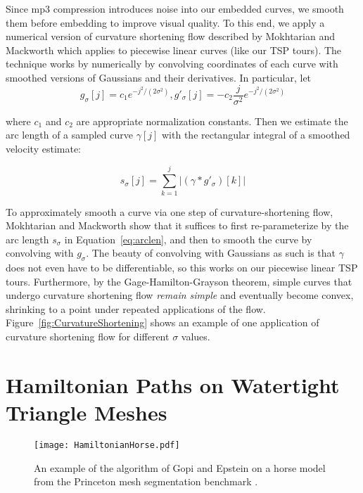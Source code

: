 \documentclass[runningheads]{llncs}
\begin{document}
Since mp3 compression introduces noise into our embedded curves, we smooth them before embedding to improve visual quality.  To this end, we apply a numerical version of curvature shortening flow described by Mokhtarian and Mackworth \cite{mokhtarian1992theory} which applies to piecewise linear curves (like our TSP tours).  The technique works by numerically by convolving coordinates of each curve with smoothed versions of Gaussians and their derivatives.  In particular, let 
\begin{equation}
  g_{\sigma}[j] = c_1 e^{-j^2 / (2 \sigma^2)}, 
  g'_{\sigma}[j] = - c_2 \frac{j}{\sigma^2} e^{-j^2 / (2 \sigma^2)}
\end{equation}

where $c_1$ and $c_2$ are appropriate normalization constants.  Then we estimate the arc length of a sampled curve $\gamma[j]$ with the rectangular integral of a smoothed velocity estimate:

\begin{equation}
  \label{eq:arclen}
  s_{\sigma}[j] = \sum_{k=1}^j |(\gamma * g'_{\sigma})[k]|
\end{equation}

To approximately smooth a curve via one step of curvature-shortening flow, Mokhtarian and Mackworth \cite{mokhtarian1992theory} show that it suffices to first re-parameterize by the arc length $s_{\sigma}$ in Equation~\ref{eq:arclen}, and then to smooth the curve by convolving with $g_{\sigma}$.  The beauty of convolving with Gaussians as such is that $\gamma$ does not even have to be differentiable, so this works on our piecewise linear TSP tours.  Furthermore, by the Gage-Hamilton-Grayson theorem, simple curves that undergo curvature shortening flow {\em remain simple} and eventually become convex, shrinking to a point under repeated applications of the flow.  Figure~\ref{fig:CurvatureShortening} shows an example of one application of curvature shortening flow for different $\sigma$ values.



\section{Hamiltonian Paths on Watertight Triangle Meshes}
\label{sec:hamiltonian}

\begin{figure}
  \centering
  \texttt{[image: HamiltonianHorse.pdf]}
  \caption{An example of the algorithm of Gopi and Epstein \cite{gopi2004single} on a horse model from the Princeton mesh segmentation benchmark \cite{Chen:2009:ABF}.}
  \label{fig:HamiltonianHorse}
\end{figure}
\end{document}

